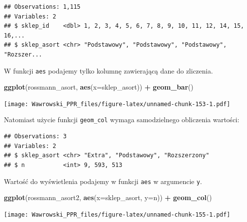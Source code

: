 \documentclass[]{book}
\newenvironment{Shaded}{\begin{snugshade}}{\end{snugshade}}
\newcommand{\KeywordTok}[1]{\textcolor[rgb]{0.13,0.29,0.53}{\textbf{#1}}}
\newcommand{\DataTypeTok}[1]{\textcolor[rgb]{0.13,0.29,0.53}{#1}}
\newcommand{\StringTok}[1]{\textcolor[rgb]{0.31,0.60,0.02}{#1}}
\newcommand{\OperatorTok}[1]{\textcolor[rgb]{0.81,0.36,0.00}{\textbf{#1}}}
\newcommand{\NormalTok}[1]{#1}
\begin{document}
\begin{verbatim}
## Observations: 1,115
## Variables: 2
## $ sklep_id    <dbl> 1, 2, 3, 4, 5, 6, 7, 8, 9, 10, 11, 12, 14, 15, 16,...
## $ sklep_asort <chr> "Podstawowy", "Podstawowy", "Podstawowy", "Rozszer...
\end{verbatim}

W funkcji \texttt{aes} podajemy tylko kolumnę zawierającą dane do
zliczenia.

\begin{Shaded}
\begin{Highlighting}[]
\KeywordTok{ggplot}\NormalTok{(rossmann_asort, }\KeywordTok{aes}\NormalTok{(}\DataTypeTok{x=}\NormalTok{sklep_asort)) }\OperatorTok{+}
\StringTok{  }\KeywordTok{geom_bar}\NormalTok{()}
\end{Highlighting}
\end{Shaded}

\texttt{[image: Wawrowski\_PPR\_files/figure-latex/unnamed-chunk-153-1.pdf]}

Natomiast użycie funkcji \texttt{geom\_col} wymaga samodzielnego
obliczenia wartości:

\begin{Shaded}
\end{Shaded}

\begin{verbatim}
## Observations: 3
## Variables: 2
## $ sklep_asort <chr> "Extra", "Podstawowy", "Rozszerzony"
## $ n           <int> 9, 593, 513
\end{verbatim}

Wartość do wyświetlenia podajemy w funkcji \texttt{aes} w argumencie
\texttt{y}.

\begin{Shaded}
\begin{Highlighting}[]
\KeywordTok{ggplot}\NormalTok{(rossmann_asort2, }\KeywordTok{aes}\NormalTok{(}\DataTypeTok{x=}\NormalTok{sklep_asort, }\DataTypeTok{y=}\NormalTok{n)) }\OperatorTok{+}
\StringTok{  }\KeywordTok{geom_col}\NormalTok{()}
\end{Highlighting}
\end{Shaded}

\texttt{[image: Wawrowski\_PPR\_files/figure-latex/unnamed-chunk-155-1.pdf]}
\end{document}

